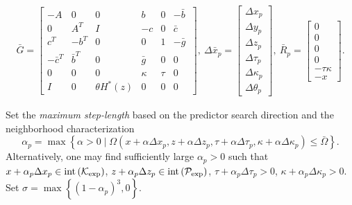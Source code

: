 \documentclass[11pt]{article}
\theoremstyle{definition}
\theoremstyle{plain}
\def\interior{\protect{\textnormal{int}}}
\begin{document}
\begin{align}
\bar G = \begin{bmatrix}
-A & 0 & 0 & b & 0 & -\bar b\ \\
0 & A^T & I & -c & 0 & \bar c \\
c^T & -b^T & 0 & 0 & 1 & -\bar g \\
-\bar c^T & \bar b^T & 0 & \bar g & 0 & 0 \\
0 & 0 & 0 & \kappa & \tau & 0 \\
I & 0 & \theta H^*(z) & 0 & 0 & 0
\end{bmatrix},\ \Delta \bar{x}_p = \begin{bmatrix}
\Delta{x}_p\\ \Delta{y}_p\\ \Delta{z}_p\\ \Delta{\tau}_p\\ \Delta{\kappa}_p\\ \Delta{\theta}_p
\end{bmatrix},\ \bar R_p= \begin{bmatrix}
0 \\ 0 \\ 0 \\ 0 \\-\tau\kappa \\ -x
\end{bmatrix}. \label{G_bar_etc_predictor_system_def}
\end{align} 

Set the \textit{maximum step-length} based on the predictor search direction and the neighborhood characterization
\[\alpha_p = \max\left\{ \alpha >0 \mid \Omega(x+\alpha \Delta x_p, z+\alpha \Delta z_p, \tau + \alpha \Delta \tau_p, \kappa + \alpha \Delta \kappa_p) \leq \bar{\Omega} \right\}. \]
Alternatively, one may find sufficiently large $\alpha_p>0$ such that $x + \alpha_p \Delta x_p \in \interior \left(\mathcal{K}_{\exp}\right)$, $z + \alpha_p \Delta z_p \in \interior \left(\mathcal{P}_{\exp}\right)$, $\tau + \alpha_p \Delta \tau_p > 0$, $\kappa + \alpha_p \Delta \kappa_p > 0$. Set $\sigma = \max\left\{(1-\alpha_p)^3, 0\right\}$. \\
\end{document}
